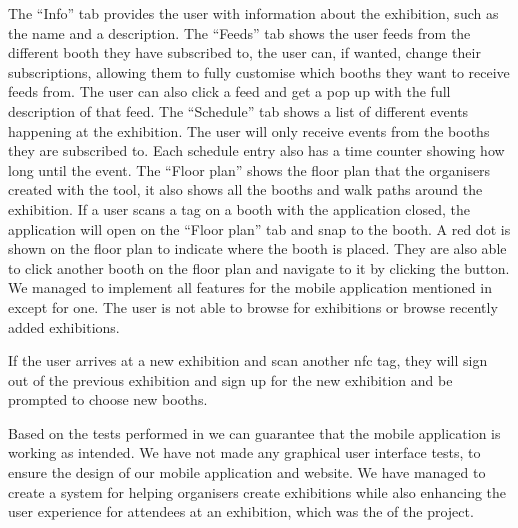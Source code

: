 The ``Info'' tab provides the user with information about the exhibition, such as the name and a description. The ``Feeds'' tab shows the user feeds from the different booth they have subscribed to, the user can, if wanted, change their subscriptions, allowing them to fully customise which booths they want to receive feeds from. The user can also click a feed and get a pop up with the full description of that feed. The ``Schedule'' tab shows a list of different events happening at the exhibition. The user will only receive events from the booths they are subscribed to. Each schedule entry also has a time counter showing how long until the event. The ``Floor plan'' shows the floor plan that the organisers created with the tool, it also shows all the booths and walk paths around the exhibition. If a user scans a tag on a booth with the application closed, the application will open on the ``Floor plan'' tab and snap to the booth. A red dot is shown on the floor plan to indicate where the booth is placed. They are also able to click another booth on the floor plan and navigate to it by clicking the button. We managed to implement all features for the mobile application mentioned in  except for one. The user is not able to browse for exhibitions or browse recently added exhibitions.

If the user arrives at a new exhibition and scan another \ac{nfc} tag, they will sign out of the previous exhibition and sign up for the new exhibition and be prompted to choose new booths. 

Based on the tests performed in  we can guarantee that the mobile application is working as intended. We have not made any graphical user interface tests, to ensure the design of our mobile application and website. We have managed to create a system for helping organisers create exhibitions while also enhancing the user experience for attendees at an exhibition, which was the of the project.